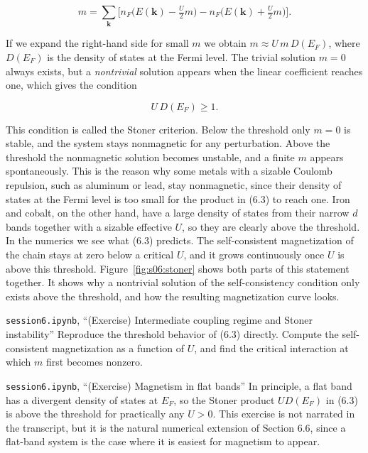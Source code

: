 \begin{equation*}
m = \sum_{\mathbf k}\Big[n_F\big(E(\mathbf k)-\tfrac{U}{2}m\big) - n_F\big(E(\mathbf k)+\tfrac{U}{2}m\big)\Big].
\end{equation*}

If we expand the right-hand side for small $m$ we obtain $m \approx U\,m\,D(E_F)$, where $D(E_F)$ is
the density of states at the Fermi level. The trivial solution $m=0$ always exists, but a
\emph{nontrivial} solution appears when the linear coefficient reaches one, which gives the condition

\begin{equation}
U\, D(E_F) \geq 1.
\end{equation}

This condition is called the Stoner criterion. Below the threshold only $m=0$ is stable, and the
system stays nonmagnetic for any perturbation. Above the threshold the nonmagnetic solution becomes
unstable, and a finite $m$ appears spontaneously. This is the reason why some metals with a sizable
Coulomb repulsion, such as aluminum or lead, stay nonmagnetic, since their density of states at the
Fermi level is too small for the product in (6.3) to reach one. Iron and cobalt, on the other hand,
have a large density of states from their narrow $d$ bands together with a sizable effective $U$, so
they are clearly above the threshold. In the numerics we see what (6.3) predicts. The self-consistent
magnetization of the chain stays at zero below a critical $U$, and it grows continuously once $U$ is
above this threshold. Figure~\ref{fig:s06:stoner} shows both parts of this statement together. It
shows why a nontrivial solution of the self-consistency condition only exists above the threshold,
and how the resulting magnetization curve looks.



\begin{notebookbox}{\texttt{session6.ipynb}, ``(Exercise) Intermediate coupling regime and Stoner instability''}
Reproduce the threshold behavior of (6.3) directly. Compute the self-consistent magnetization as a
function of $U$, and find the critical interaction at which $m$ first becomes nonzero.
\end{notebookbox}

\begin{notebookbox}{\texttt{session6.ipynb}, ``(Exercise) Magnetism in flat bands''}
In principle, a flat band has a divergent density of states at $E_F$, so the Stoner product
$U D(E_F)$ in (6.3) is above the threshold for practically any $U>0$. This exercise is not narrated
in the transcript, but it is the natural numerical extension of Section 6.6, since a flat-band system
is the case where it is easiest for magnetism to appear.
\end{notebookbox}

